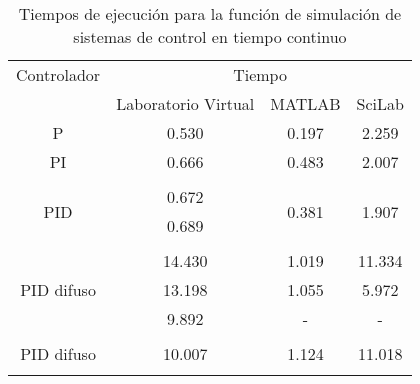         {\setlength\LTleft{0pt}
        \setlength\LTright{0pt}
        \centering
        \renewcommand{\arraystretch}{0.80}
        \begin{longtable}{c @{\extracolsep{\fill}} ccc}
            \caption[Tiempos de ejecución para la función de simulación de sistemas de control en tiempo continuo]{Tiempos de ejecución para la función de simulación de sistemas de control en tiempo continuo}
            \label{tab:timeC} \\
            \toprule
            Controlador   &        \multicolumn{3}{c}{Tiempo}        \\ \cmidrule{1-1} \cmidrule{2-4}
                        &   Laboratorio Virtual  & MATLAB & SciLab  \\ \cmidrule{2-2} \cmidrule{3-3} \cmidrule{4-4}
            \endhead
            \bottomrule
            \endfoot
            P                            & 0.530  &         0.197          &        2.259           \\
            PI                           & 0.666  &         0.483          &        2.007           \\
                                        &        &                        &                        \\[-3pt]
            \multirow{2}{*}{PID}         & 0.672  & \multirow{2}{*}{0.381} & \multirow{2}{*}{1.907} \\
                                        & 0.689  &                        &                        \\
                                        &        &                        &                        \\[-3pt]
            \multirow{3}{*}{PID difuso}  & 14.430 &         1.019          &        11.334          \\
                                        & 13.198 &         1.055          &        5.972           \\
                                        & 9.892  &           -            &          -             \\
                                        &        &                        &                        \\[-3pt]
            PID difuso                   & 10.007 &         1.124          &        11.018          \\
                                        &        &                        &                        \\[-3pt]

\end{longtable}}
